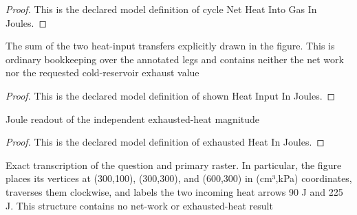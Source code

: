 \begin{proof}
  This is the declared model definition of cycle Net Heat Into Gas In Joules.
\end{proof}
\begin{definition}
  \label{def:physics:phyx-mini-0421:phyxminiproblems-problemphyxmini0421-shownheatinputinjoules}
  The sum of the two heat-input transfers explicitly drawn in the figure. This is ordinary bookkeeping over the annotated legs and contains neither the net work nor the requested cold-reservoir exhaust value
\end{definition}
\begin{proof}
  This is the declared model definition of shown Heat Input In Joules.
\end{proof}
\begin{definition}
  \label{def:physics:phyx-mini-0421:phyxminiproblems-problemphyxmini0421-exhaustedheatinjoules}
  Joule readout of the independent exhausted-heat magnitude
\end{definition}
\begin{proof}
  This is the declared model definition of exhausted Heat In Joules.
\end{proof}
\begin{definition}
  \label{def:physics:phyx-mini-0421:phyxminiproblems-problemphyxmini0421-matchesproblemandprimaryfigure}
  Exact transcription of the question and primary raster. In particular, the figure places its vertices at (300,100), (300,300), and (600,300) in (cm³,kPa) coordinates, traverses them clockwise, and labels the two incoming heat arrows 90 J and 225 J. This structure contains no net-work or exhausted-heat result
\end{definition}
